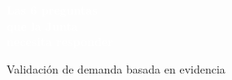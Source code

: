 \documentclass[aspectratio=169, 11pt]{beamer}
\begin{document}

{
\begin{frame}[plain]
\vfill
\begin{center}
{\Huge\bfseries\textcolor{white}{Las 6 preguntas\\[8pt]que la Junta\\[8pt]necesita responder}}

\vspace{20pt}

\vspace{14pt}
{\normalsize\textcolor{white!80}{Validación de demanda basada en evidencia}}
\end{center}
\vfill
\end{frame}
}
\end{document}
